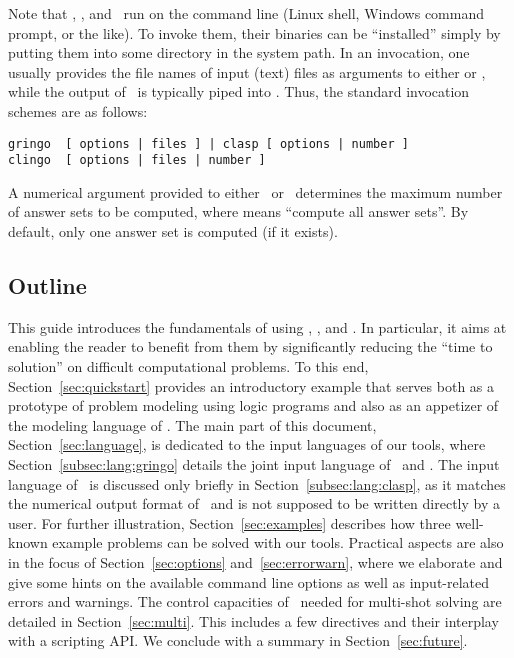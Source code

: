 Note that \gringo, \clasp, and \clingo\ 
run on the command line (Linux shell, Windows command prompt, or the like).
To invoke them, their binaries can be ``installed''
simply by putting them into some directory in the system path.
In an invocation,
one usually provides the file names of input (text) files 
as arguments to either \gringo or \clingo,
while the output of \gringo\ is typically piped into \clasp.
Thus, the standard invocation schemes are as follows:
\begin{lstlisting}[numbers=none]
gringo  [ options | files ] | clasp [ options | number ]
clingo  [ options | files | number ]
\end{lstlisting}
A numerical argument provided to either \clasp\ or \clingo\
determines the maximum number of answer sets to be computed,
where \code{0} means ``compute all answer sets''.
By default, only one answer set is computed (if it exists).

\subsection{Outline}

This guide introduces the fundamentals of using
\gringo, \clasp, and \clingo.
In particular, it aims at enabling the reader to benefit from them
by significantly reducing the ``time to solution'' on difficult computational problems.
To this end,
Section~\ref{sec:quickstart}
provides an introductory example 
that serves both as a prototype of problem modeling using logic programs
and also as an appetizer of the modeling language of \gringo.
The main part of this document, Section~\ref{sec:language},
is dedicated to the input languages of our tools,
where Section~\ref{subsec:lang:gringo}
details the joint input language of \gringo\ and \clingo.
The input language of \clasp\ is discussed only briefly in Section~\ref{subsec:lang:clasp},
as it matches the numerical output format of \gringo\ and
is not supposed to be written directly by a user.
For %
further illustration,
Section~\ref{sec:examples} describes how three well-known example problems
can be solved with our tools.
Practical aspects are also in the focus of Section~\ref{sec:options} and~\ref{sec:errorwarn},
where we elaborate and give some hints on the available command line options
as well as input-related errors and warnings. %
The control capacities of \clingo\ needed for multi-shot solving are detailed in Section~\ref{sec:multi}.
This includes a few directives and their interplay with a scripting API.
We conclude with a summary in Section~\ref{sec:future}.

